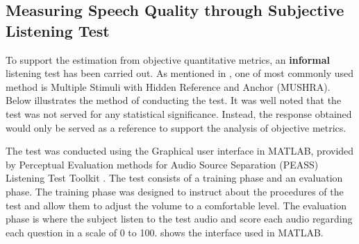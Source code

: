\documentclass[a4paper,twoside,12pt,hidelinks]{article}
\begin{document}
\subsection{Measuring Speech Quality through Subjective Listening Test}
To support the estimation from objective quantitative metrics, an \textbf{informal} listening test has been carried out. As mentioned in , one of most commonly used method is Multiple Stimuli with Hidden Reference and Anchor (MUSHRA). Below illustrates the method of conducting the test. It was well noted that the test was not served for any statistical significance. Instead, the response obtained would only be served as a reference to support the analysis of objective metrics.

The test was conducted using the Graphical user interface in MATLAB, provided by Perceptual Evaluation methods for Audio Source Separation (PEASS) Listening Test Toolkit \cite{Emiya2011SubjectiveSeparation}. The test consists of a training phase and an evaluation phase. The training phase was designed to instruct about the procedures of the test and allow them to adjust the volume to a comfortable level. The evaluation phase is where the subject listen to the test audio and score each audio regarding each question in a scale of 0 to 100.  shows the interface used in MATLAB.
\end{document}
